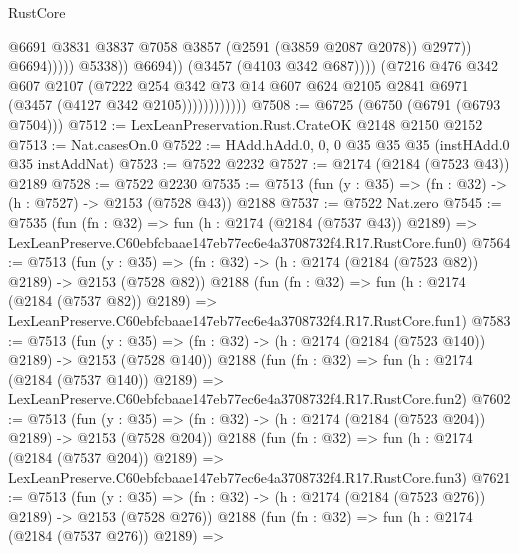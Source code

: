 \begin{lexlean}{RustCore}
\begin{coremodule}
                                              @6691
                                              @3831
                                              @3837
                                              @7058
                                              @3857
                                              (@2591 (@3859 @2087 @2078))
                                              @2977))
                                          @6694)))))
                                @5338))
                            @6694))
                        (@3457 (@4103 @342 @687))))
                    (@7216
                      @476
                      @342
                      @607
                      @2107
                      (@7222
                        @254
                        @342
                        @73
                        @14
                        @607
                        @624
                        @2105
                        @2841
                        @6971
                        (@3457 (@4127 @342 @2105))))))))))))
@7508 := @6725 (@6750 (@6791 (@6793 @7504)))
@7512 := LexLeanPreservation.Rust.CrateOK @2148 @2150 @2152
@7513 := Nat.casesOn.{0}
@7522 := HAdd.hAdd.{0, 0, 0} @35 @35 @35 (instHAdd.{0} @35 instAddNat)
@7523 := @7522 @2232
@7527 := @2174 (@2184 (@7523 @43)) @2189
@7528 := @7522 @2230
@7535 := @7513 (fun (y : @35) => (fn : @32) -> (h : @7527) -> @2153 (@7528 @43)) @2188
@7537 := @7522 Nat.zero
@7545 := @7535
    (fun (fn : @32) =>
    fun (h : @2174 (@2184 (@7537 @43)) @2189) =>
    LexLeanPreserve.C60ebfcbaae147eb77ec6e4a3708732f4.R17.RustCore.fun0)
@7564 := @7513
    (fun (y : @35) => (fn : @32) -> (h : @2174 (@2184 (@7523 @82)) @2189) -> @2153 (@7528 @82))
    @2188
    (fun (fn : @32) =>
    fun (h : @2174 (@2184 (@7537 @82)) @2189) =>
    LexLeanPreserve.C60ebfcbaae147eb77ec6e4a3708732f4.R17.RustCore.fun1)
@7583 := @7513
    (fun (y : @35) => (fn : @32) -> (h : @2174 (@2184 (@7523 @140)) @2189) -> @2153 (@7528 @140))
    @2188
    (fun (fn : @32) =>
    fun (h : @2174 (@2184 (@7537 @140)) @2189) =>
    LexLeanPreserve.C60ebfcbaae147eb77ec6e4a3708732f4.R17.RustCore.fun2)
@7602 := @7513
    (fun (y : @35) => (fn : @32) -> (h : @2174 (@2184 (@7523 @204)) @2189) -> @2153 (@7528 @204))
    @2188
    (fun (fn : @32) =>
    fun (h : @2174 (@2184 (@7537 @204)) @2189) =>
    LexLeanPreserve.C60ebfcbaae147eb77ec6e4a3708732f4.R17.RustCore.fun3)
@7621 := @7513
    (fun (y : @35) => (fn : @32) -> (h : @2174 (@2184 (@7523 @276)) @2189) -> @2153 (@7528 @276))
    @2188
    (fun (fn : @32) =>
    fun (h : @2174 (@2184 (@7537 @276)) @2189) =>

\end{coremodule}
\end{lexlean}
